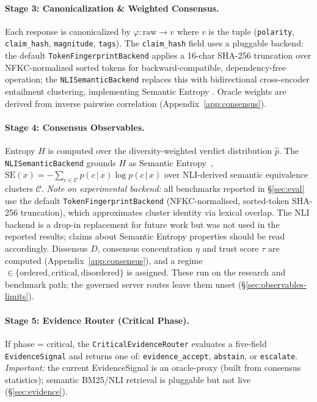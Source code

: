 \documentclass[10pt,twocolumn]{article}
\newcommand{\trust}{\tau}
\begin{document}
\paragraph{Stage 3: Canonicalization \& Weighted Consensus.}
Each response is canonicalized by $\varphi: \mathrm{raw} \rightarrow v$
where $v$ is the tuple (\texttt{polarity}, \texttt{claim\_hash},
\texttt{magnitude}, \texttt{tags}).
The \texttt{claim\_hash} field uses a pluggable backend: the default
\texttt{TokenFingerprintBackend} applies a 16-char SHA-256 truncation over
NFKC-normalized sorted tokens for backward-compatible, dependency-free
operation; the \texttt{NLISemanticBackend} replaces this with bidirectional
cross-encoder entailment clustering, implementing Semantic Entropy
\cite{kuhn2023semantic}. Oracle weights are derived from
inverse pairwise correlation (Appendix~\ref{app:consensus}).

\paragraph{Stage 4: Consensus Observables.}
Entropy $H$ is computed over the diversity-weighted verdict distribution
$\hat{p}$. The \texttt{NLISemanticBackend} grounds $H$ as Semantic
Entropy~\cite{kuhn2023semantic},
$\mathrm{SE}(x) = -\sum_{c \in \mathcal{C}} p(c\,|\,x)\log p(c\,|\,x)$
over NLI-derived semantic equivalence clusters $\mathcal{C}$.
\emph{Note on experimental backend:} all benchmarks reported in
\S\ref{sec:eval} use the default \texttt{TokenFingerprintBackend}
(NFKC-normalised, sorted-token SHA-256 truncation), which approximates
cluster identity via lexical overlap. The NLI backend is a
drop-in replacement for future work but was not used in the
reported results; claims about Semantic Entropy properties should
be read accordingly.
Dissensus $D$, consensus concentration $\eta$ and trust score
$\trust$ are computed (Appendix~\ref{app:consensus}), and a regime
$\in\{\text{ordered}, \text{critical}, \text{disordered}\}$ is
assigned. These run on the research and benchmark path; the governed
server routes leave them unset (\S\ref{sec:observables-limits}).

\paragraph{Stage 5: Evidence Router (Critical Phase).}
If phase = critical, the \texttt{CriticalEvidenceRouter} evaluates a
five-field \texttt{EvidenceSignal} and returns one of:
\texttt{evidence\_accept}, \texttt{abstain}, or \texttt{escalate}.
\emph{Important:} the current EvidenceSignal is an oracle-proxy
(built from consensus statistics); semantic BM25/NLI retrieval is
pluggable but not live (\S\ref{sec:evidence}).
\end{document}
